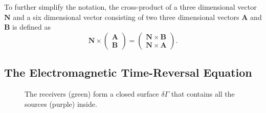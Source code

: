 To further simplify the notation, the cross-product of a three dimensional vector \(\bm{N}\) and a six dimensional vector consisting of two three dimensional vectors \(\bm{A}\) and \(\bm{B}\) is defined as
\begin{equation}
    \bm{N} \times \begin{pmatrix}
        \bm{A} \\
        \bm{B}
    \end{pmatrix} = \begin{pmatrix}
        \bm{N} \times \bm{B} \\
        \bm{N} \times \bm{A}
    \end{pmatrix}.
\end{equation}

\subsection{The Electromagnetic Time-Reversal Equation}
\begin{figure}
    \centering
    \def\svgwidth{0.35\textwidth}
    
    \caption{The receivers (green) form a closed surface \(\delta \Gamma \) that contains all the sources (purple) inside.}\label{fig:closed_surface}
\end{figure}

